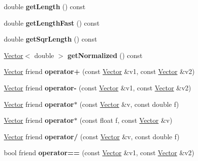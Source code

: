 \begin{DoxyCompactItemize}
double {\bfseries get\+Length} () const
\item 
\hypertarget{classVector_3_01double_01_4_a0fad0f9052b8d2ec59b394aac129bef7}{}\label{classVector_3_01double_01_4_a0fad0f9052b8d2ec59b394aac129bef7} 
double {\bfseries get\+Length\+Fast} () const
\item 
\hypertarget{classVector_3_01double_01_4_a45fcdbc27c5610fca7692000d4f9240e}{}\label{classVector_3_01double_01_4_a45fcdbc27c5610fca7692000d4f9240e} 
double {\bfseries get\+Sqr\+Length} () const
\item 
\hypertarget{classVector_3_01double_01_4_a303b9c39d780ada0f3a11d9b7d5b013a}{}\label{classVector_3_01double_01_4_a303b9c39d780ada0f3a11d9b7d5b013a} 
\hyperlink{classVector}{Vector}$<$ double $>$ {\bfseries get\+Normalized} () const
\item 
\hypertarget{classVector_3_01double_01_4_a59de32a591c4cb0f974c5f211debd80d}{}\label{classVector_3_01double_01_4_a59de32a591c4cb0f974c5f211debd80d} 
\hyperlink{classVector}{Vector} friend {\bfseries operator+} (const \hyperlink{classVector}{Vector} \&v1, const \hyperlink{classVector}{Vector} \&v2)
\item 
\hypertarget{classVector_3_01double_01_4_ab5c582330db135efe1f5173de0161bf2}{}\label{classVector_3_01double_01_4_ab5c582330db135efe1f5173de0161bf2} 
\hyperlink{classVector}{Vector} friend {\bfseries operator-\/} (const \hyperlink{classVector}{Vector} \&v1, const \hyperlink{classVector}{Vector} \&v2)
\item 
\hypertarget{classVector_3_01double_01_4_a56d5375118a99cc5f09e569159ba5a27}{}\label{classVector_3_01double_01_4_a56d5375118a99cc5f09e569159ba5a27} 
\hyperlink{classVector}{Vector} friend {\bfseries operator$\ast$} (const \hyperlink{classVector}{Vector} \&v, const double f)
\item 
\hypertarget{classVector_3_01double_01_4_a52e173484e4857b32de07ec14154d8bd}{}\label{classVector_3_01double_01_4_a52e173484e4857b32de07ec14154d8bd} 
\hyperlink{classVector}{Vector} friend {\bfseries operator$\ast$} (const float f, const \hyperlink{classVector}{Vector} \&v)
\item 
\hypertarget{classVector_3_01double_01_4_a0a620c34839ebc5a2e40f96a4baac58b}{}\label{classVector_3_01double_01_4_a0a620c34839ebc5a2e40f96a4baac58b} 
\hyperlink{classVector}{Vector} friend {\bfseries operator/} (const \hyperlink{classVector}{Vector} \&v, const double f)
\item 
\hypertarget{classVector_3_01double_01_4_aaedc01bef36d4736d01a69c2043bb1f1}{}\label{classVector_3_01double_01_4_aaedc01bef36d4736d01a69c2043bb1f1} 
bool friend {\bfseries operator==} (const \hyperlink{classVector}{Vector} \&v1, const \hyperlink{classVector}{Vector} \&v2)
\end{DoxyCompactItemize}
